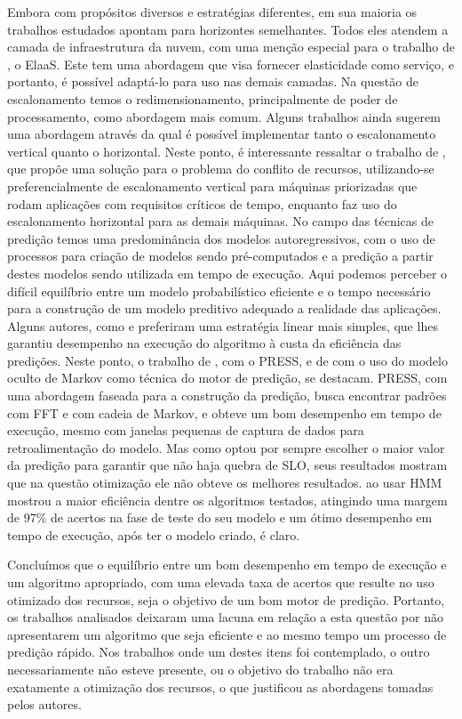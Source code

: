 \documentclass[twoside,english,brazilian]{UNISINOSmonografia}
\begin{document}
Embora com propósitos diversos e estratégias diferentes, em sua maioria os trabalhos estudados apontam para horizontes semelhantes. Todos eles atendem a camada de infraestrutura da nuvem, com uma menção especial para o trabalho de \cite{Kranas2012}, o ElaaS. Este tem uma abordagem que visa fornecer elasticidade como serviço, e portanto, é possível adaptá-lo para uso nas demais camadas. Na questão de escalonamento temos o redimensionamento, principalmente de poder de processamento, como abordagem mais comum. Alguns trabalhos ainda sugerem uma abordagem através da qual é possível implementar tanto o escalonamento vertical quanto o horizontal. Neste ponto, é interessante ressaltar o trabalho de \cite{Yazdanov2012}, que propõe uma solução para o problema do conflito de recursos, utilizando-se preferencialmente de escalonamento vertical para máquinas priorizadas que rodam aplicações com requisitos críticos de tempo, enquanto faz uso do escalonamento horizontal para as demais máquinas. No campo das técnicas de predição temos uma predominância dos modelos autoregressivos, com o uso de processos para criação de modelos sendo pré-computados e a predição a partir destes modelos sendo utilizada em tempo de execução. Aqui podemos perceber o difícil equilíbrio entre um modelo probabilístico eficiente e o tempo necessário para a construção de um modelo preditivo adequado a realidade das aplicações. Alguns autores, como \cite{Yazdanov2012} e \cite{Costache2012} preferiram uma estratégia linear mais simples, que lhes garantiu desempenho na execução do algoritmo à custa da eficiência das predições. Neste ponto, o trabalho de \citep{Wilkes2010}, com o PRESS, e de \cite{Nikravesh2014} com o uso do modelo oculto de Markov como técnica do motor de predição, se destacam. PRESS, com uma abordagem faseada para a construção da predição, busca encontrar padrões com FFT e com cadeia de Markov, e obteve um bom desempenho em tempo de execução, mesmo com janelas pequenas de captura de dados para retroalimentação do modelo. Mas como optou por sempre escolher o maior valor da predição para garantir que não haja quebra de SLO, seus resultados mostram que na questão otimização ele não obteve os melhores resultados. \cite{Nikravesh2014} ao usar HMM mostrou a maior eficiência dentre os algoritmos testados, atingindo uma margem de 97\% de acertos na fase de teste do seu modelo e um ótimo desempenho em tempo de execução, após ter o modelo criado, é claro.

Concluímos que o equilíbrio entre um bom desempenho em tempo de execução e um algoritmo apropriado, com uma elevada taxa de acertos que resulte no uso otimizado dos recursos, seja o objetivo de um bom motor de predição. Portanto, os trabalhos analisados deixaram uma lacuna em relação a esta questão por não apresentarem um algoritmo que seja eficiente e ao mesmo tempo um processo de predição rápido. Nos trabalhos onde um destes itens foi contemplado, o outro necessariamente não esteve presente, ou o objetivo do trabalho não era exatamente a otimização dos recursos, o que justificou as abordagens tomadas pelos autores.
\end{document}
